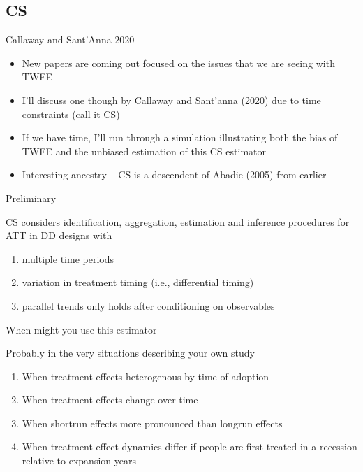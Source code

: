 \documentclass{beamer}
\begin{document}
\subsection{CS}

\begin{frame}{Callaway and Sant'Anna 2020}

\begin{itemize}
\item New papers are coming out focused on the issues that we are seeing with TWFE
\item I'll discuss one though by Callaway and Sant'anna (2020) due to time constraints (call it CS)
\item If we have time, I'll run through a simulation illustrating both the bias of TWFE and the unbiased estimation of this CS estimator
\item Interesting ancestry -- CS is a descendent of Abadie (2005) from earlier

\end{itemize}

\end{frame}

\begin{frame}{Preliminary}

CS considers identification, aggregation, estimation and inference procedures for ATT in DD designs with

\begin{enumerate}
\item multiple time periods
\item variation in treatment timing (i.e., differential timing)
\item parallel trends only holds after conditioning on observables
\end{enumerate}

\end{frame}

\begin{frame}{When might you use this estimator}

Probably in the very situations describing your own study
\begin{enumerate}
\item When treatment effects heterogenous by time of adoption
\item When treatment effects change over time
\item When shortrun effects more pronounced than longrun effects
\item When treatment effect dynamics differ if people are first treated in a recession relative to expansion years
\end{enumerate}

\end{frame}
\end{document}
